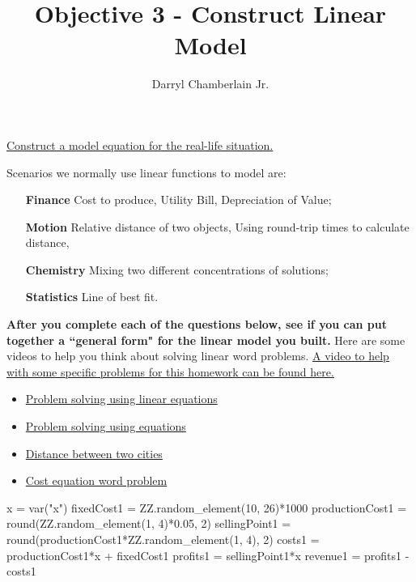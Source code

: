 \documentclass{ximera}
\author{Darryl Chamberlain Jr.}
\title{Objective 3 - Construct Linear Model}
\begin{document}
\begin{abstract}

\end{abstract}

\maketitle
 
\href{https://cnx.org/contents/mwjClAV_@15.1:xJt0U6vR@13/2-3-Models-and-Applications}{Construct a model equation for the real-life situation.}
 

Scenarios we normally use linear functions to model are:
	\begin{itemize}
		\item[\textbf{Finance}] Cost to produce, Utility Bill, Depreciation of Value; 
		\item[\textbf{Motion}] Relative distance of two objects, Using round-trip times to calculate distance, 
		\item[\textbf{Chemistry}] Mixing two different concentrations of solutions;
		\item[\textbf{Statistics}] Line of best fit.
	\end{itemize}

\textbf{After you complete each of the questions below, see if you can put together a ``general form" for the linear model you built.} Here are some videos to help you think about solving linear word problems. \href{https://www.youtube.com/watch?v=ylp6rx1N4P0&list=PLsCqF7qYpC5ZynJm-TTnZ6OsnKOwU7hs_&index=3}{A video to help with some specific problems for this homework can be found here.}

\begin{itemize}
	\item \href{http://openstax.org/l/lineqprobsolve}{Problem solving using linear equations}
	\item \href{http://openstax.org/l/equationprsolve}{Problem solving using equations}
	\item \href{http://openstax.org/l/ratetimesolve}{Distance between two cities}
	\item \href{http://openstax.org/l/lineqappl}{Cost equation word problem} 
\end{itemize}

\begin{sagesilent}
x = var("x")
fixedCost1 = ZZ.random_element(10, 26)*1000
productionCost1 = round(ZZ.random_element(1, 4)*0.05, 2)
sellingPoint1 = round(productionCost1*ZZ.random_element(1, 4), 2)
costs1 = productionCost1*x + fixedCost1
profits1 = sellingPoint1*x
revenue1 = profits1 - costs1
\end{sagesilent}
\end{document}
